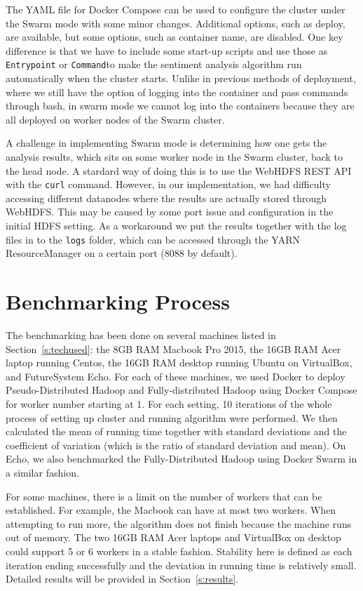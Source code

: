 The YAML file for Docker Compose can be used to configure the cluster
under the Swarm mode with some minor changes. Additional options, such
as deploy, are available, but some options, such as container name,
are disabled.  One key difference is that we have to include some
start-up scripts and use those as  \verb|Entrypoint| or  \verb|Command|to 
make the
sentiment analysis algorithm run automatically when the cluster
starts. Unlike in previous methods of deployment, where we still have
the option of logging into the container and pass commands through
bash, in swarm mode we cannot log into the containers because they are
all deployed on worker nodes of the Swarm cluster.

A challenge in implementing Swarm mode is determining how one gets the
analysis results, which sits on some worker node in the Swarm cluster,
back to the head node. A stardard way of doing this is to use the
WebHDFS REST API with the \verb|curl| command. However, in our
implementation, we had difficulty accessing different datanodes
where the results are actually stored through WebHDFS. This may be
caused by some port issue and configuration in the initial HDFS
setting. As a workaround we put the results together with the log
files in to the  \verb|logs| folder, which can be accessed through the YARN
ResourceManager on a certain port (8088 by default).


\section{Benchmarking Process}\label{s:benchrproc}

The benchmarking has been done on several machines listed in
Section~\ref{s:techused}: the 8GB RAM Macbook Pro 2015, the 16GB RAM
Acer laptop running Centos, the 16GB RAM desktop running Ubuntu on
VirtualBox, and FutureSystem Echo.  For each of these machines, we
used Docker to deploy Pseudo-Distributed Hadoop and Fully-distributed
Hadoop using Docker Compose for worker number starting at 1. For each
setting, 10 iterations of the whole process of setting up cluster and
running algorithm were performed. We then calculated the mean of
running time together with standard deviations and the coefficient of
variation (which is the ratio of standard deviation and mean).  On
Echo, we also benchmarked the Fully-Distributed Hadoop using Docker
Swarm in a similar fashion.

For some machines, there is a limit on the number of workers that can
be established. For example, the Macbook can have at most two
workers. When attempting to run more, the algorithm does not finish
because the machine runs out of memory. The two 16GB RAM Acer laptops
and VirtualBox on desktop could support 5 or 6 workers in a stable
fashion.  Stability here is defined as each iteration ending
successfully and the deviation in running time is relatively
small. Detailed results will be provided in Section~\ref{s:results}.

